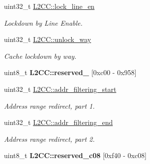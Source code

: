 \begin{DoxyCompactItemize}
uint32\+\_\+t \mbox{\hyperlink{group__L2C-310__cache_gadbfb555b4972509b0ab3787aebf3cf23}{L2\+C\+C\+::lock\+\_\+line\+\_\+en}}
\begin{DoxyCompactList}\small\item\em Lockdown by Line Enable. \end{DoxyCompactList}\item 
\mbox{\label{group__L2C-310__cache_ga29c892e3731778a520ce963d37cb4da2}} 
uint32\+\_\+t \mbox{\hyperlink{group__L2C-310__cache_ga29c892e3731778a520ce963d37cb4da2}{L2\+C\+C\+::unlock\+\_\+way}}
\begin{DoxyCompactList}\small\item\em Cache lockdown by way. \end{DoxyCompactList}\item 
\mbox{\label{group__L2C-310__cache_ga29a796af690a545db1b3a722a9b85fa6}} 
uint8\+\_\+t {\bfseries L2\+C\+C\+::reserved\+\_} \mbox{[}0xc00 -\/ 0x958\mbox{]}
\item 
\mbox{\label{group__L2C-310__cache_ga062a4d913b2698c58ece4bd4b60b30aa}} 
uint32\+\_\+t \mbox{\hyperlink{group__L2C-310__cache_ga062a4d913b2698c58ece4bd4b60b30aa}{L2\+C\+C\+::addr\+\_\+filtering\+\_\+start}}
\begin{DoxyCompactList}\small\item\em Address range redirect, part 1. \end{DoxyCompactList}\item 
\mbox{\label{group__L2C-310__cache_ga6d7fc48f292c09b992efaa61ec49cc4a}} 
uint32\+\_\+t \mbox{\hyperlink{group__L2C-310__cache_ga6d7fc48f292c09b992efaa61ec49cc4a}{L2\+C\+C\+::addr\+\_\+filtering\+\_\+end}}
\begin{DoxyCompactList}\small\item\em Address range redirect, part 2. \end{DoxyCompactList}\item 
\mbox{\label{group__L2C-310__cache_ga3d619cbc3b61f01fc84934e1decf5958}} 
uint8\+\_\+t {\bfseries L2\+C\+C\+::reserved\+\_\+c08} \mbox{[}0xf40 -\/ 0xc08\mbox{]}
\item 
\mbox{\label{group__L2C-310__cache_gafb06e31ba83abe243926605bb13ddff0}} 

\end{DoxyCompactItemize}
